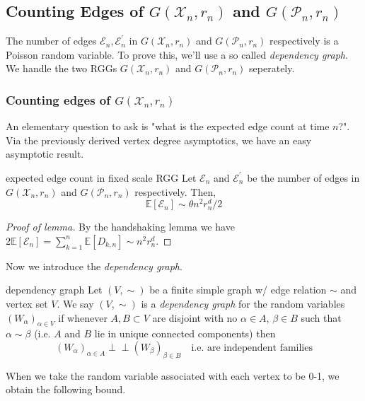 \documentclass{article}
\newcommand{\indep}{\perp\!\!\!\!\perp}
\begin{document}
\subsection{Counting Edges of $G(\mathcal{X}_n, r_n)$ and $G(\mathcal{P}_n, r_n)$}

The number of edges $\mathcal{E}_n, \mathcal{E}_n^\prime$ in $G(\mathcal{X}_n, r_n)$ and $G(\mathcal{P}_n, r_n)$ respectively 
is a Poisson random variable. To prove this, we'll use a so called {\it dependency graph}. We handle the two 
RGGs $G(\mathcal{X}_n, r_n)$ and $G(\mathcal{P}_n, r_n)$ seperately. 

\subsubsection*{Counting edges of $G(\mathcal{X}_n, r_n)$}

An elementary question to ask is "what is the expected edge count at time $n$?". Via the previously derived 
vertex degree asymptotics, we have an easy asymptotic result.  

\begin{proposition}[]{expected edge count in fixed scale RGG}
    Let $\mathcal{E}_n$ and $\mathcal{E}^\prime_n$ be the number of edges in $G(\mathcal{X}_n, r_n)$ and 
    $G(\mathcal{P}_n, r_n)$ respectively. Then,
    \[\mathbb{E}[\mathcal{E}_n] \sim \theta n^2 r_n^d / 2\]
\end{proposition}

\begin{proof}[Proof of lemma]
    By the handshaking lemma we have $2\mathbb{E}[\mathcal{E}_n] = \sum_{k = 1}^n \mathbb{E}[D_{k, n}] \sim n^2 r_n^d$. 
\end{proof}

Now we introduce the {\it dependency graph}. 

\begin{definition}[]{dependency graph}
    Let $(V, \sim)$ be a finite simple graph w/ edge relation $\sim$ and vertex set $V$. We say $(V, \sim)$ is a 
    {\it dependency graph} for the random variables $(W_\alpha)_{\alpha \in V}$ if whenever $A, B \subset V$ are 
    disjoint with no $\alpha \in A$, $\beta \in B$ such that $\alpha \sim \beta$ (i.e. $A$ and $B$ lie in unique 
    connected components) then \[(W_\alpha)_{\alpha \in A} \indep (W_\beta)_{\beta \in B} \quad \text{i.e. are independent families}\]
\end{definition}

When we take the random variable associated with each vertex to be 0-1, we obtain the following bound. 
\end{document}
